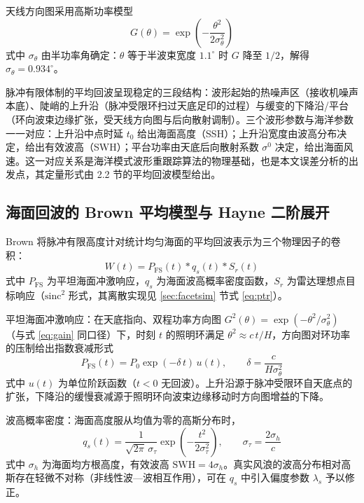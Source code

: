 \documentclass[a4paper]{article}
\begin{document}
天线方向图采用高斯功率模型
\begin{equation}
	G(\theta) = \exp\!\left( -\frac{\theta^{2}}{2 \sigma_\theta^{2}} \right)
	\label{eq:gain}
\end{equation}
式中 $\sigma_\theta$ 由半功率角确定：$\theta$ 等于半波束宽度 $1.1^\circ$ 时 $G$ 降至 $1/2$，解得 $\sigma_\theta = 0.934^\circ$。

脉冲有限体制的平均回波呈现稳定的三段结构：波形起始的热噪声区（接收机噪声本底）、陡峭的上升沿（脉冲受限环扫过天底足印的过程）与缓变的下降沿/平台（环向波束边缘扩张，受天线方向图与后向散射调制）。三个波形参数与海洋参数一一对应：上升沿中点时延 $t_0$ 给出海面高度（SSH）；上升沿宽度由波高分布决定，给出有效波高（SWH）；平台功率由天底后向散射系数 $\sigma^0$ 决定，给出海面风速。这一对应关系是海洋模式波形重跟踪算法的物理基础，也是本文误差分析的出发点，其定量形式由 2.2 节的平均回波模型给出。

\subsection{海面回波的 Brown 平均模型与 Hayne 二阶展开}
\label{sec:brown-hayne}

Brown\cite{brown1977} 将脉冲有限高度计对统计均匀海面的平均回波表示为三个物理因子的卷积：
\begin{equation}
	W(t) = P_{\mathrm{FS}}(t) \ast q_s(t) \ast S_r(t)
	\label{eq:brown}
\end{equation}
式中 $P_{\mathrm{FS}}$ 为平坦海面冲激响应，$q_s$ 为海面波高概率密度函数，$S_r$ 为雷达理想点目标响应（$\mathrm{sinc}^2$ 形式，其离散实现见 \ref{sec:facetsim} 节式 \eqref{eq:ptr}）。

平坦海面冲激响应：在天底指向、双程功率方向图 $G^{2}(\theta) = \exp(-\theta^{2} / \sigma_\theta^{2})$（与式 \eqref{eq:gain} 同口径）下，时刻 $t$ 的照明环满足 $\theta^{2} \approx c\, t / H$，方向图对环功率的压制给出指数衰减形式
\begin{equation}
	P_{\mathrm{FS}}(t) = P_0 \exp(-\delta\, t)\, u(t), \qquad \delta = \frac{c}{H \sigma_\theta^{2}}
	\label{eq:pfs}
\end{equation}
式中 $u(t)$ 为单位阶跃函数（$t < 0$ 无回波）。上升沿源于脉冲受限环自天底点的扩张，下降沿的缓慢衰减源于照明环向波束边缘移动时方向图增益的下降。

波高概率密度：海面高度服从均值为零的高斯分布时，
\begin{equation}
	q_s(t) = \frac{1}{\sqrt{2 \pi}\, \sigma_\tau} \exp\!\left( -\frac{t^{2}}{2 \sigma_\tau^{2}} \right), \qquad \sigma_\tau = \frac{2 \sigma_h}{c}
	\label{eq:qs}
\end{equation}
式中 $\sigma_h$ 为海面均方根高度，有效波高 $\mathrm{SWH} = 4 \sigma_h$。真实风浪的波高分布相对高斯存在轻微不对称（非线性波—波相互作用），可在 $q_s$ 中引入偏度参数 $\lambda_s$ 予以修正。
\end{document}
